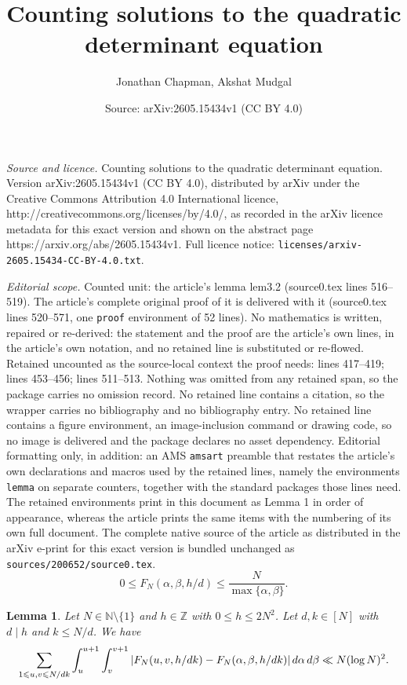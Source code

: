\documentclass[10pt,a4paper]{amsart}
\title{Counting solutions to the quadratic determinant equation}
\author{Jonathan Chapman, Akshat Mudgal}
\date{Source: arXiv:2605.15434v1 (CC BY 4.0)}
\newtheorem{lemma}{Lemma}
\def \N {\mathbb{N}}
\def \Z {\mathbb{Z}}
\def\d{{\,{\rm d}}}
\renewcommand{\leq}{\leqslant}
\begin{document}
\maketitle

\noindent\emph{Source and licence.} Counting solutions to the quadratic determinant equation. Version arXiv:2605.15434v1 (CC BY 4.0), distributed by arXiv under the Creative Commons Attribution 4.0 International licence, http://creativecommons.org/licenses/by/4.0/, as recorded in the arXiv licence metadata for this exact version and shown on the abstract page https://arxiv.org/abs/2605.15434v1. Full licence notice: \texttt{licenses/arxiv-2605.15434-CC-BY-4.0.txt}.\par\smallskip

\noindent\textit{Editorial scope.} Counted unit: the article's lemma lem3.2 (source0.tex lines 516--519). The article's complete original proof of it is delivered with it (source0.tex lines 520--571, one \texttt{proof} environment of 52 lines). No mathematics is written, repaired or re-derived: the statement and the proof are the article's own lines, in the article's own notation, and no retained line is substituted or re-flowed.  Retained uncounted as the source-local context the proof needs: lines 417--419; lines 453--456; lines 511--513.  Nothing was omitted from any retained span, so the package carries no omission record.  No retained line contains a citation, so the wrapper carries no bibliography and no bibliography entry.  No retained line contains a figure environment, an image-inclusion command or drawing code, so no image is delivered and the package declares no asset dependency.  Editorial formatting only, in addition: an AMS \texttt{amsart} preamble that restates the article's own declarations and macros used by the retained lines, namely the environments \texttt{lemma} on separate counters, together with the standard packages those lines need.  The retained environments print in this document as Lemma 1 in order of appearance, whereas the article prints the same items with the numbering of its own full document.  The complete native source of the article as distributed in the arXiv e-print for this exact version is bundled unchanged as \texttt{sources/200652/source0.tex}.
\begin{equation}\label{eqn3.5}
   0\leqslant  F_N(\alpha,\beta,h/d) \leqslant \frac{N}{\max\{\alpha,\beta\}}.
\end{equation}

\begin{lemma} \label{lem3.1}
    Let $N\in\N\setminus\{1\}$ and $h\in\Z$ with $0\leqslant h\leqslant 2N^2$. Let $d,k\in[N]$ with $d\mid h$ and $k\leqslant N/d$. We have
    \[  \sum_{1 \leq u,v \leq N/dk} \int_{u}^{u+1} \int_{v}^{v+1} |  F_N(u,v,h/dk) -   F_N(\alpha, \beta, h/dk) |  \d \alpha \d \beta   \ll N (\log N)^2.  \]
\end{lemma}
\end{document}
